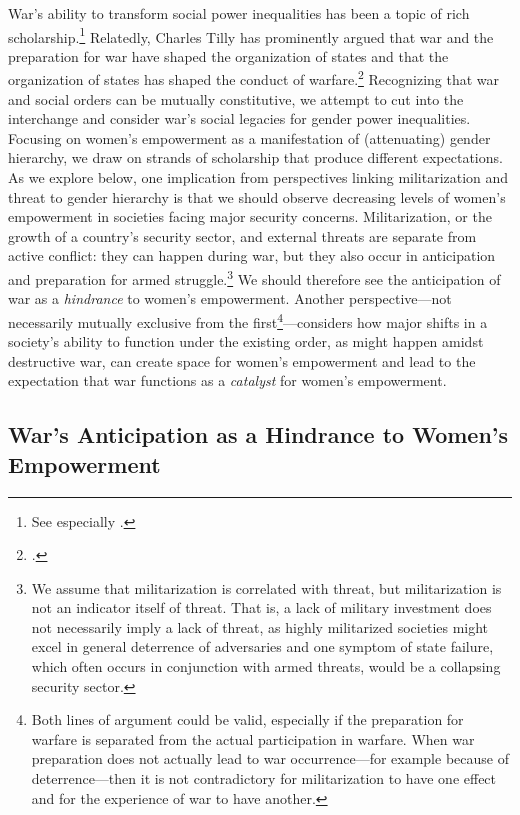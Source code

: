 \documentclass [12pt] {article}
\begin{document}
War's ability to transform social power inequalities has been a topic of rich scholarship.\footnote{See especially .} Relatedly, Charles Tilly has prominently argued that war and the preparation for war have shaped the organization of states and that the organization of states has shaped the conduct of warfare.\footnote{.} Recognizing that war and social orders can be mutually constitutive, we attempt to cut into the interchange and consider war's social legacies for gender power inequalities.\\

Focusing on women's empowerment as a manifestation of (attenuating) gender hierarchy, we draw on strands of scholarship that produce different expectations. As we explore below, one implication from perspectives linking militarization and threat to gender hierarchy is that we should observe decreasing levels of women's empowerment in societies facing major security concerns. Militarization, or the growth of a country's security sector, and external threats are separate from active conflict: they can happen during war, but they also occur in anticipation and preparation for armed struggle.\footnote{We assume that militarization is correlated with threat, but militarization is not an indicator itself of threat. That is, a lack of military investment does not necessarily imply a lack of threat, as highly militarized societies might excel in general deterrence of adversaries and one symptom of state failure, which often occurs in conjunction with armed threats, would be a collapsing security sector.} We should therefore see the anticipation of war as a \emph{hindrance} to women's empowerment. Another perspective---not necessarily mutually exclusive from the first\footnote{Both lines of argument could be valid, especially if the preparation for warfare is separated from the actual participation in warfare. When war preparation does not actually lead to war occurrence---for example because of deterrence---then it is not contradictory for militarization to have one effect and for the experience of war to have another.}---considers how major shifts in a society's ability to function under the existing order, as might happen amidst destructive war, can create space for women's empowerment and lead to the expectation that war functions as a \emph{catalyst} for women's empowerment.\\

\subsection*{War's Anticipation as a Hindrance to Women's Empowerment}
\vspace*{.2in}
\end{document}
